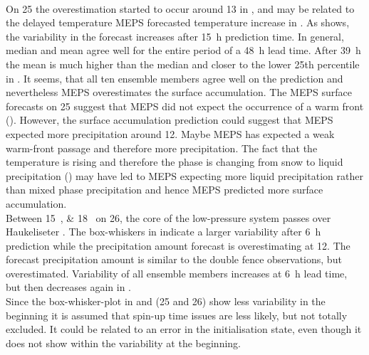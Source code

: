 \\
On \SI{25}{\dec} the overestimation started to occur around \SI{13}{\UTC} in , and may be related to the delayed temperature MEPS forecasted temperature increase in .  As  shows, the variability in the forecast increases after \SI{15}{\hour} prediction time. In general, median and mean agree well for the entire period of a \SI{48}{\hour} lead time. After \SI{39}{\hour} the mean is much higher than the median and closer to the lower 25th percentile in . It seems, that all ten ensemble members agree well on the prediction and nevertheless MEPS overestimates the surface accumulation. The MEPS surface forecasts on \SI{25}{\dec} suggest that MEPS did not expect the occurrence of a warm front (). However, the surface accumulation prediction could suggest that MEPS expected more precipitation around \SI{12}{\UTC}. Maybe MEPS has expected a weak warm-front passage and therefore more precipitation. The fact that the temperature is rising and therefore the phase is changing from snow to liquid precipitation () may have led to MEPS expecting more liquid precipitation rather than mixed phase precipitation and hence MEPS predicted more surface accumulation.
\\
Between \SIlist{15;18}{\UTC} on \SI{26}{\dec}, the core of the low-pressure system passes over Haukeliseter . The box-whiskers in  indicate a larger variability after \SI{6}{\hour} prediction while the precipitation amount forecast is overestimating at \SI{12}{\UTC}. The forecast precipitation amount is similar to the double fence observations, but overestimated.
Variability of all ensemble members increases at \SI{6}{\hour} lead time, but then decreases again in .  
\\
Since the box-whisker-plot in  and  (\num{25} and \SI{26}{\dec}) show less variability in the beginning it is assumed that spin-up time issues are less likely, but not totally excluded. It could be related to an error in the initialisation state, even though it does not show within the variability at the beginning. 
